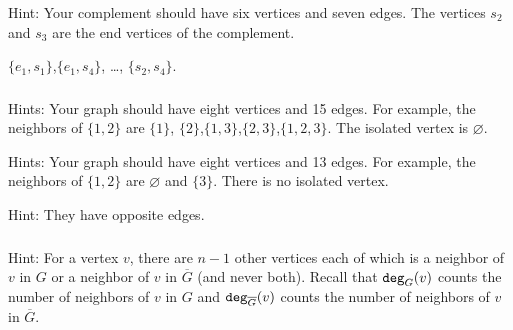 \subsubsection*{ \answers}
\begin{apart}
    \item Hint: Your complement should have six vertices and seven edges.  The vertices $s_2$ and $s_3$ are the end vertices of the complement.
    \item $\{e_1,s_1\}$,$\{e_1,s_4\}$, \ldots, $\{s_2,s_4\}$.
\end{apart}

\subsubsection*{ \answers}
\begin{apart}
    \item Hints: Your graph should have eight vertices and 15 edges.  For example, the neighbors of $\{1,2\}$ are $\{1\}$, $\{2\}$,$\{1,3\}$,$\{2,3\}$,$\{1,2,3\}$.  The isolated vertex is $\varnothing$.
    \item Hints: Your graph should have eight vertices and 13 edges.  For example, the neighbors of $\{1,2\}$ are $\varnothing$ and $\{3\}$.  There is no isolated vertex.
    \item Hint: They have opposite edges.
\end{apart}

\subsubsection*{ \answers}
Hint: For a vertex $v$, there are $n-1$ other vertices each of which is a neighbor of $v$ in $G$ or a neighbor of $v$ in $\overline{G}$ (and never both). Recall that $\texttt{deg}_G(v)$ counts the number of neighbors of $v$ in $G$ and $\texttt{deg}_{\overline{G}}(v)$ counts the number of neighbors of $v$ in $\overline{G}$. 



